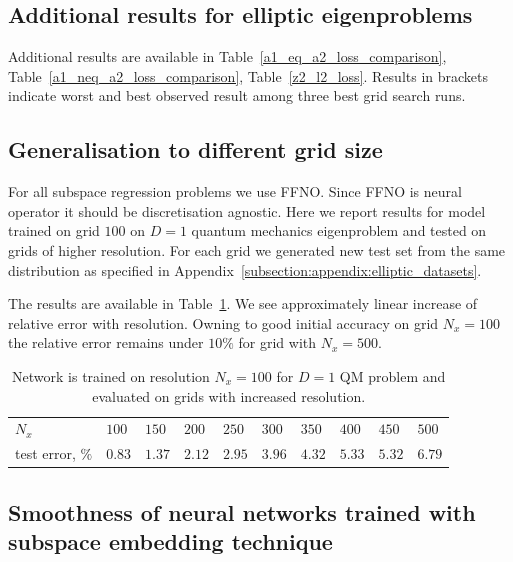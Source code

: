 \documentclass{article}
\begin{document}
\newpage

\subsection{Additional results for elliptic eigenproblems}
Additional results are available in Table~\ref{a1_eq_a2_loss_comparison}, Table~\ref{a1_neq_a2_loss_comparison}, Table~\ref{z2_l2_loss}. Results in brackets indicate worst and best observed result among three best grid search runs.

\subsection{Generalisation to different grid size}
\label{appendix:generalisation_to_different_grid_size}
For all subspace regression problems we use FFNO. Since FFNO is neural operator it should be discretisation agnostic. Here we report results for model trained on grid $100$ on $D=1$ quantum mechanics eigenproblem and tested on grids of higher resolution. For each grid we generated new test set from the same distribution as specified in Appendix~\ref{subsection:appendix:elliptic_datasets}.

The results are available in Table~\ref{table:discretisation_invariance}. We see approximately linear increase of relative error with resolution. Owning to good initial accuracy on grid $N_x=100$ the relative error remains under $10\%$ for grid with $N_x=500$.

\begin{table}[h!]
\caption{Network is trained on resolution $N_x=100$ for $D=1$ QM problem and evaluated on grids with increased resolution.}
\label{table:discretisation_invariance}
\begin{center}
\hspace*{-0.5cm}  
\begin{tabular}{llllllllll}
\toprule
$N_x$ & $100$ & $150$ & $200$ & $250$ & $300$ & $350$ & $400$ & $450$ & $500$\\
test error, $\%$ & $0.83$ & $1.37$ & $2.12$ & $2.95$ & $3.96$ & $4.32$ & $5.33$ &  $5.32$ & $6.79$ \\
\bottomrule
\end{tabular}
\end{center}
\end{table}

\subsection{Smoothness of neural networks trained with subspace embedding technique}
\label{appendix:smoothness_results}
\end{document}
